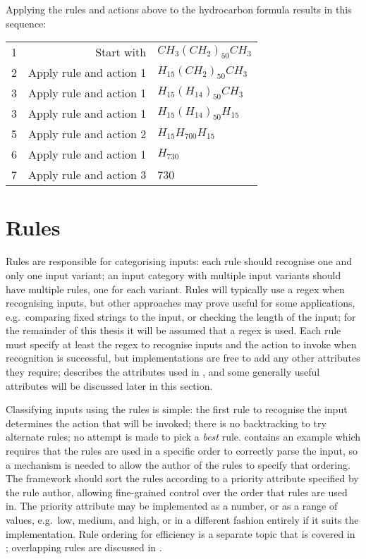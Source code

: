 Applying the rules and actions above to the hydrocarbon formula results in
this sequence:

\begin{tabular}{lrl}

    1 & Start with              & $CH_{3}{(CH_{2})}_{50}CH_{3}$ \\
    2 & Apply rule and action 1 & $H_{15}{(CH_{2})}_{50}CH_{3}$ \\
    3 & Apply rule and action 1 & $H_{15}{(H_{14})}_{50}CH_{3}$ \\
    3 & Apply rule and action 1 & $H_{15}{(H_{14})}_{50}H_{15}$ \\
    5 & Apply rule and action 2 & $H_{15}H_{700}H_{15}$ \\
    6 & Apply rule and action 1 & $H_{730}$ \\
    7 & Apply rule and action 3 & 730 \\

\end{tabular}

\section{Rules}

\label{rules in architecture}

Rules are responsible for categorising inputs: each rule should recognise
one and only one input variant; an input category with multiple input
variants should have multiple rules, one for each variant.  Rules will
typically use a regex when recognising inputs, but other approaches may
prove useful for some applications, e.g.\ comparing fixed strings to the
input, or checking the length of the input; for the remainder of this
thesis it will be assumed that a regex is used.  Each rule must specify at
least the regex to recognise inputs and the action to invoke when
recognition is successful, but implementations are free to add any other
attributes they require;  describes the
attributes used in \parsername{}, and some generally useful attributes will
be discussed later in this section.

Classifying inputs using the rules is simple: the first
rule to recognise the input determines the action that will be invoked;
there is no backtracking to try alternate rules; no attempt is made to pick
a \textit{best\/} rule.  
contains an example which requires that the rules are used in a specific
order to correctly parse the input, so a mechanism is needed to allow the
author of the rules to specify that ordering.  The framework should sort
the rules according to a priority attribute specified by the rule author,
allowing fine-grained control over the order that rules are used in.  The
priority attribute may be implemented as a number, or as a range of values,
e.g.\ low, medium, and high, or in a different fashion entirely if it suits
the implementation.  Rule ordering for efficiency is a separate topic that
is covered in ; overlapping rules
are discussed in .

